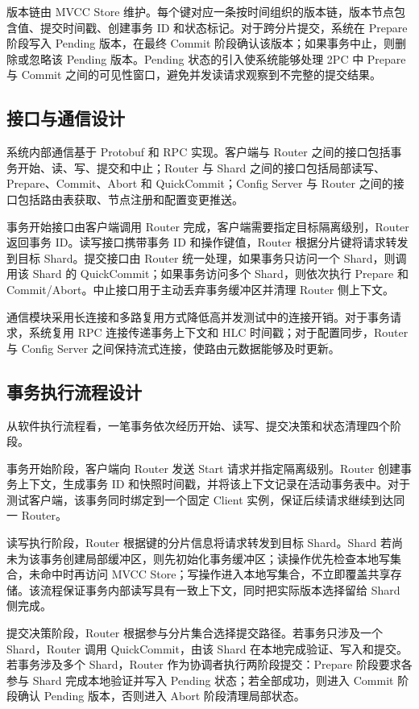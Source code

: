 版本链由 MVCC Store 维护。每个键对应一条按时间组织的版本链，版本节点包含值、提交时间戳、创建事务 ID 和状态标记。对于跨分片提交，系统在 Prepare 阶段写入 Pending 版本，在最终 Commit 阶段确认该版本；如果事务中止，则删除或忽略该 Pending 版本。Pending 状态的引入使系统能够处理 2PC 中 Prepare 与 Commit 之间的可见性窗口，避免并发读请求观察到不完整的提交结果。

\subsection{接口与通信设计}

系统内部通信基于 Protobuf 和 RPC 实现。客户端与 Router 之间的接口包括事务开始、读、写、提交和中止；Router 与 Shard 之间的接口包括局部读写、Prepare、Commit、Abort 和 QuickCommit；Config Server 与 Router 之间的接口包括路由表获取、节点注册和配置变更推送。

事务开始接口由客户端调用 Router 完成，客户端需要指定目标隔离级别，Router 返回事务 ID。读写接口携带事务 ID 和操作键值，Router 根据分片键将请求转发到目标 Shard。提交接口由 Router 统一处理，如果事务只访问一个 Shard，则调用该 Shard 的 QuickCommit；如果事务访问多个 Shard，则依次执行 Prepare 和 Commit/Abort。中止接口用于主动丢弃事务缓冲区并清理 Router 侧上下文。

通信模块采用长连接和多路复用方式降低高并发测试中的连接开销。对于事务请求，系统复用 RPC 连接传递事务上下文和 HLC 时间戳；对于配置同步，Router 与 Config Server 之间保持流式连接，使路由元数据能够及时更新。

\subsection{事务执行流程设计}

从软件执行流程看，一笔事务依次经历开始、读写、提交决策和状态清理四个阶段。

事务开始阶段，客户端向 Router 发送 Start 请求并指定隔离级别。Router 创建事务上下文，生成事务 ID 和快照时间戳，并将该上下文记录在活动事务表中。对于测试客户端，该事务同时绑定到一个固定 Client 实例，保证后续请求继续到达同一 Router。

读写执行阶段，Router 根据键的分片信息将请求转发到目标 Shard。Shard 若尚未为该事务创建局部缓冲区，则先初始化事务缓冲区；读操作优先检查本地写集合，未命中时再访问 MVCC Store；写操作进入本地写集合，不立即覆盖共享存储。该流程保证事务内部读写具有一致上下文，同时把实际版本选择留给 Shard 侧完成。

提交决策阶段，Router 根据参与分片集合选择提交路径。若事务只涉及一个 Shard，Router 调用 QuickCommit，由该 Shard 在本地完成验证、写入和提交。若事务涉及多个 Shard，Router 作为协调者执行两阶段提交：Prepare 阶段要求各参与 Shard 完成本地验证并写入 Pending 状态；若全部成功，则进入 Commit 阶段确认 Pending 版本，否则进入 Abort 阶段清理局部状态。

